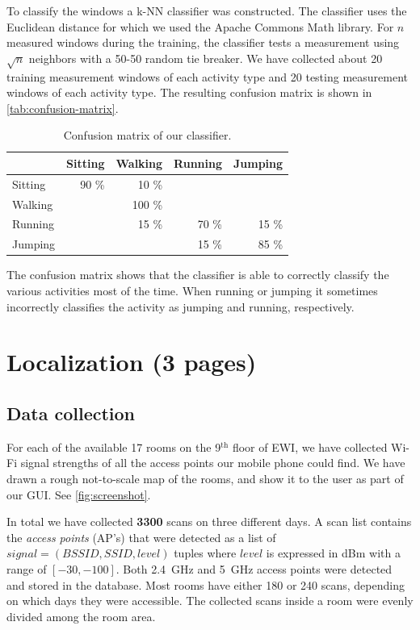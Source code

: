 \documentclass[a4paper,10pt,twoside]{IEEEtran}
\begin{document}
To classify the windows a k-NN classifier was constructed. The classifier uses the Euclidean distance for which we used the Apache Commons Math library. For $n$ measured windows during the training, the classifier tests a measurement using $\sqrt{n}$ neighbors with a 50-50 random tie breaker. We have collected about 20 training measurement windows of each activity type and 20 testing measurement windows of each activity type. The resulting confusion matrix is shown in \autoref{tab:confusion-matrix}.

\begin{table}[ht]
\centering
\caption{Confusion matrix of our classifier.}
\begin{tabular}{lrrrr}
\toprule
& Sitting & Walking & Running & Jumping  \\
\midrule
Sitting & 90 \% &  10 \% &       &       \\
Walking &       & 100 \% &       &       \\
Running &       &  15 \% & 70 \% & 15 \% \\
Jumping &       &        & 15 \% & 85 \% \\
\bottomrule
\end{tabular}
\label{tab:confusion-matrix}
 \end{table}

The confusion matrix shows that the classifier is able to correctly classify the various activities most of the time. When running or jumping it sometimes incorrectly classifies the activity as jumping and running, respectively.

\section{Localization (3 pages)}
\label{sec:localization}

\subsection{Data collection}
\label{sec:loc-localization-method}

For each of the available 17 rooms on the 9$^{\text{th}}$ floor of EWI, we have collected Wi-Fi signal strengths of all the access points our mobile phone could find.
We have drawn a rough not-to-scale map of the rooms, and show it to the user as part of our GUI. See \autoref{fig:screenshot}.

In total we have collected \textbf{3300} scans on three different days.
A scan list contains the \emph{access points} (AP's) that were detected as a list of $signal = (BSSID, SSID, level)$ tuples where $level$ is expressed in dBm with a range of $[-30,-100]$.
Both 2.4~GHz and 5~GHz access points were detected and stored in the database.
Most rooms have either 180 or 240 scans, depending on which days they were accessible.
The collected scans inside a room were evenly divided among the room area.
\end{document}
